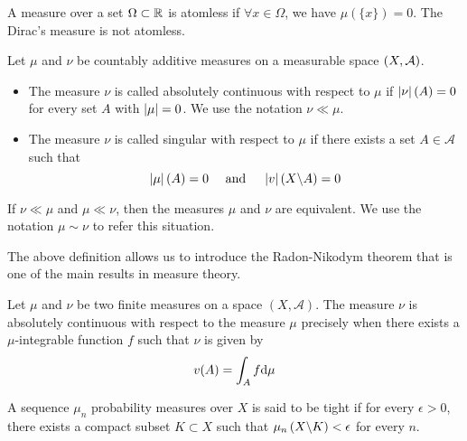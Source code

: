 A measure over a set $\Omega\subset \mathbb{R}$ is atomless if $\forall x \in \Omega$, we have  $\mu(\{x\})=0$. The Dirac's measure is not atomless. 
\begin{definition}
	Let $\mu$ and $\nu$ be countably additive measures on a measurable space $\left( X, \mathcal A \right)$. 
	\begin{itemize}
		\item The measure $\nu$ is called absolutely continuous with respect to $\mu$ if $\left| \nu \right|(A)=0$ for every set $A$ with $\left| \mu \right|=0$. We use the notation $\nu \ll \mu$.
		\item The measure $\nu$ is called singular with respect to $\mu$ if there exists a set $A\in \mathcal{A}$ such that
		\begin{equation*}
			\left| \mu \right|(A)=0 \quad \text{ and }\quad  \left| v \right|(X\backslash A)=0
		\end{equation*}
	\end{itemize}
	
	If $\nu \ll \mu $ and $\mu \ll \nu$, then the measures $\mu$ and $\nu$ are equivalent. We use the notation $\mu \sim \nu$ to refer this situation.
\end{definition}
The above definition allows us to introduce the Radon-Nikodym theorem that is one of the main results in measure theory.
\begin{theorem}
	Let $\mu$ and $\nu$ be two finite measures on a space $(X, \mathcal A)$.
	The measure $\nu$ is absolutely continuous with respect to the measure $\mu$ precisely	when there exists a $\mu$-integrable function $f$ such that $\nu$ is given by
	\begin{equation*}
		v(A)=\int_A f\mathrm{d}\mu
	\end{equation*}
\end{theorem}

\begin{definition}[$L^p$ Spaces]
	
\end{definition}


\begin{definition}
	A sequence $\mu_n$ probability measures over $X$ is said to be tight if for every $\epsilon> 0$, there exists a compact subset $K\subset X$ such that $\mu_n\left( X\backslash K \right)< \epsilon$ for every $n$.
\end{definition}




